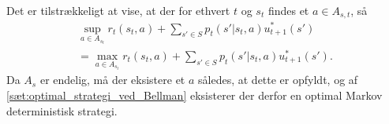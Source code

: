 \begin{bev} \textbf{} %
\newline
Det er tilstrækkeligt at vise, at der for ethvert $t$ og $s_t$ findes et $a\in A_{s,t}$, så
\begin{align*}
    \sup_{a\in A_{s_t}} r_t(s_t,a) + \sum_{s'\in S}p_t\left(s' | s_t, a\right)u^*_{t+1}(s')\nonumber \\
    = \max_{a\in A_{s_t}} r_t(s_t,a) + \sum_{s'\in S}p_t\left(s' | s_t, a\right)u^*_{t+1}(s').
\end{align*}
Da $A_s$ er endelig, må der eksistere et $a$ således, at dette er opfyldt, og af \autoref{sæt:optimal_strategi_ved_Bellman} eksisterer der derfor en optimal Markov deterministisk strategi.

\end{bev}






